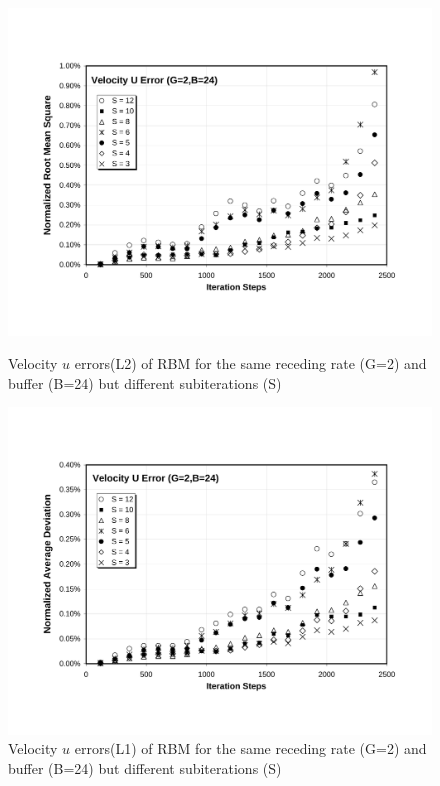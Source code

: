 \cp

\begin{figure}[htbp]
  \begin{center}
\includegraphics[scale=0.6]{../figures/Exp3-CASE1-dt0.005/G_2_B_24/G2-B24-U-NRMS.pdf}
    \caption{Velocity $u$ errors(L2) of RBM for the same receding rate (G=2) and buffer (B=24) but different subiterations (S)}
        \vspace{0.5in}
\includegraphics[scale=0.6]{../figures/Exp3-CASE1-dt0.005/G_2_B_24/G2-B24-U-NAD.pdf}
    \caption{Velocity $u$ errors(L1) of RBM for the same receding rate (G=2) and buffer (B=24) but different subiterations (S)}
  \end{center}
\end{figure}

